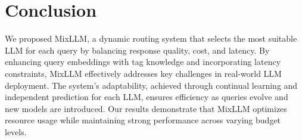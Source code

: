 \section{Conclusion}


We proposed MixLLM, a dynamic routing system that selects the most suitable LLM for each query by balancing response quality, cost, and latency. By enhancing query embeddings with tag knowledge and incorporating latency constraints, MixLLM effectively addresses key challenges in real-world LLM deployment. The system's adaptability, achieved through continual learning and independent prediction for each LLM, ensures efficiency as queries evolve and new models are introduced. Our results demonstrate that MixLLM optimizes resource usage while maintaining strong performance across varying budget levels.



